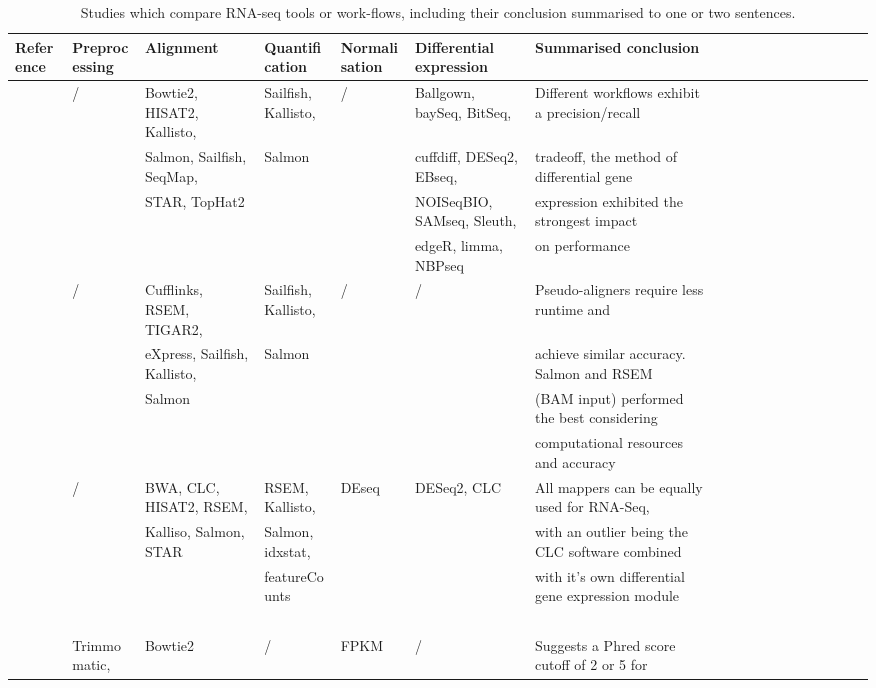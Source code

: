 \begin{landscape}
	\pagestyle{empty}
\label{tab:test}
\begin{table}[h]
	\tiny
    \centering
    \captionsetup{font=scriptsize}
    \caption{Studies which compare RNA-seq tools or work-flows, including their conclusion summarised to one or two sentences.}
    \begin{adjustwidth}{-1cm}{}
    \begin{tabular}{llllllllllllllllll}
		\toprule
        \textbf{Reference} & \textbf{Preprocessing} & \textbf{Alignment} & \textbf{Quantification} & \textbf{Normalisation} & \textbf{Differential expression} & \textbf{Summarised conclusion}  \\ \midrule
        \cite{williams2017empirical} & / &  Bowtie2, HISAT2, Kallisto, & Sailfish, Kallisto,  & / & Ballgown, baySeq, BitSeq,  & Different workflows exhibit a precision/recall   \\ 
        ~ & ~ &  Salmon, Sailfish, SeqMap,  & Salmon & ~ & cuffdiff, DESeq2, EBseq,  & tradeoff,  the method of differential gene  \\ 
        ~ & ~ & STAR, TopHat2 & ~ & ~ & NOISeqBIO, SAMseq, Sleuth,  &  expression exhibited the strongest impact  \\ 
        ~ & ~ & ~ & ~ & ~ & edgeR, limma, NBPseq &  on performance  \\ \hline
        \cite{Zhang2017} & / & Cufflinks, RSEM, TIGAR2,  & Sailfish, Kallisto,  & / & / & Pseudo-aligners require less runtime and   \\ 
        ~ & ~ & eXpress, Sailfish, Kallisto,  & Salmon & ~ & ~ & achieve similar accuracy. Salmon and RSEM  \\
        ~ & ~ & Salmon & ~ & ~ & ~ &  (BAM input) performed the best considering  \\ 
        ~ & ~ & ~ & ~ & ~ & ~ &  computational resources and accuracy  \\ \hline
        \cite{Schaarschmidt2020} & / & BWA, CLC, HISAT2, RSEM,   & RSEM, Kallisto,  &  DEseq & DESeq2, CLC & All mappers can be equally used for RNA-Seq,    \\ 
        ~ & ~ & Kalliso, Salmon, STAR & Salmon,  idxstat, & ~ & ~ & with an outlier being the CLC software combined   \\ 
        ~ & ~ & ~ & featureCounts & ~ & ~ & with it's own differential gene expression module  \\ 
        ~ & ~ & ~ & ~ & ~ & ~ &   \\ \hline
        \cite{MacManes2014} & Trimmomatic,  & Bowtie2  & / & FPKM & / & Suggests a Phred score cutoff of 2 or 5 for    \\ 

\end{tabular}
\end{adjustwidth}
\end{table}
\end{landscape}

